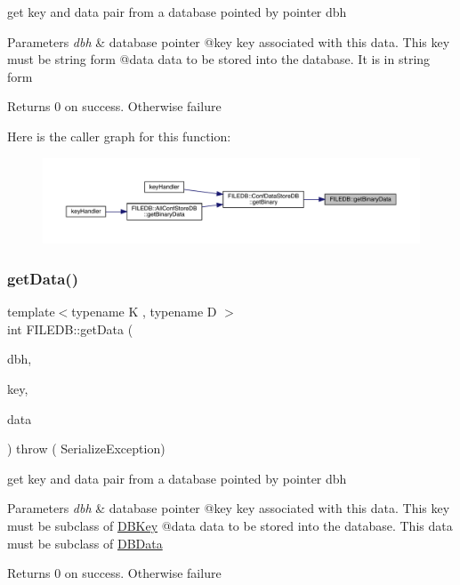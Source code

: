 get key and data pair from a database pointed by pointer dbh


\begin{DoxyParams}{Parameters}
{\em dbh} & database pointer @key key associated with this data. This key must be string form @data data to be stored into the database. It is in string form\\
\hline
\end{DoxyParams}
\begin{DoxyReturn}{Returns}
0 on success. Otherwise failure 
\end{DoxyReturn}
Here is the caller graph for this function\+:\nopagebreak
\begin{figure}[H]
\begin{center}
\leavevmode
\includegraphics[width=350pt]{d2/de6/namespaceFILEDB_a0de8699301294566d0e11786f4016a2a_icgraph}
\end{center}
\end{figure}
\mbox{\label{namespaceFILEDB_a0d18d10ad6d490786b6fe538fbd45dc3}} 
\subsubsection{\texorpdfstring{getData()}{getData()}\hspace{0.1cm}{\footnotesize\ttfamily [1/2]}}
{\footnotesize\ttfamily template$<$typename K , typename D $>$ \\
int F\+I\+L\+E\+D\+B\+::get\+Data (\begin{DoxyParamCaption}\item[{\mbox{\hyperlink{other__libs_2filedb_2filehash_2ffdb__db_8h_a0b27b956926453a7a8141ea8e10f0df8}{F\+F\+D\+B\+\_\+\+DB}} $\ast$}]{dbh,  }\item[{const K \&}]{key,  }\item[{D \&}]{data }\end{DoxyParamCaption}) throw ( Serialize\+Exception) }

get key and data pair from a database pointed by pointer dbh


\begin{DoxyParams}{Parameters}
{\em dbh} & database pointer @key key associated with this data. This key must be subclass of \mbox{\hyperlink{classFILEDB_1_1DBKey}{D\+B\+Key}} @data data to be stored into the database. This data must be subclass of \mbox{\hyperlink{classFILEDB_1_1DBData}{D\+B\+Data}}\\
\hline
\end{DoxyParams}
\begin{DoxyReturn}{Returns}
0 on success. Otherwise failure 
\end{DoxyReturn}
\mbox{\label{namespaceFILEDB_a7381d9e3dd76dc6eb741797e16c3052c}} 
